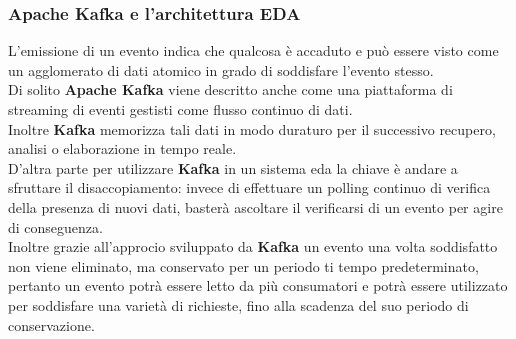 \subsubsection{Apache Kafka e l'architettura EDA}
L'emissione di un evento indica che qualcosa è accaduto e può essere visto come un agglomerato di dati atomico in grado di soddisfare l'evento stesso. \\
Di solito \textbf{Apache Kafka} viene descritto anche come una piattaforma di \gls{streaming di eventi}{} gestisti come flusso continuo di dati. \\Inoltre \textbf{Kafka} memorizza tali dati in modo duraturo per il successivo recupero, analisi o elaborazione in tempo reale.
\\D'altra parte per utilizzare \textbf{Kafka} in un sistema \gls{eda}{} la chiave è andare a sfruttare il disaccopiamento: invece di effettuare un polling continuo di verifica della presenza di nuovi dati, basterà ascoltare il verificarsi di un evento per agire di conseguenza. \\Inoltre grazie all'approcio sviluppato da \textbf{Kafka} un evento una volta soddisfatto non viene eliminato, ma conservato per un periodo ti tempo predeterminato, pertanto un evento potrà essere letto da più consumatori e potrà essere utilizzato per soddisfare una varietà di richieste, fino alla scadenza del suo periodo di conservazione. \\
\pagebreak
